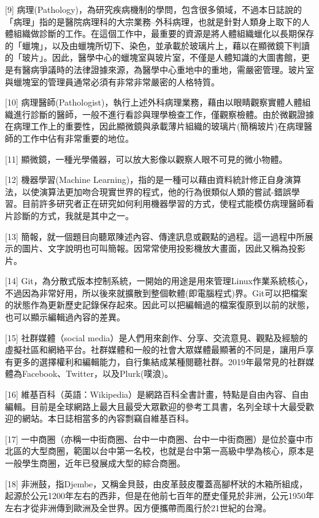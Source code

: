 \documentclass[
]{article}
\begin{document}
{[}9{]}
病理(Pathology)，為研究疾病機制的學問，包含很多領域，不過本日誌說的「病理」指的是醫院病理科的大宗業務--外科病理，也就是針對人類身上取下的人體組織做診斷的工作。在這個工作中，最重要的資源是將人體組織蠟化以長期保存的「蠟塊」，以及由蠟塊所切下、染色，並承載於玻璃片上，藉以在顯微鏡下判讀的「玻片」。因此，醫學中心的蠟塊室與玻片室，不僅是人體知識的大圖書館，更是有醫病爭議時的法律證據來源，為醫學中心重地中的重地，需嚴密管理。玻片室與蠟塊室的管理員通常必須有非常非常嚴密的人格特質。

{[}10{]}
病理醫師(Pathologist)，執行上述外科病理業務，藉由以眼睛觀察實體人體組織進行診斷的醫師，一般不進行看診與理學檢查工作，僅觀察檢體。由於微觀證據在病理工作上的重要性，因此顯微鏡與承載薄片組織的玻璃片(簡稱玻片)在病理醫師的工作中佔有非常重要的地位。

{[}11{]} 顯微鏡，一種光學儀器，可以放大影像以觀察人眼不可見的微小物體。

{[}12{]} 機器學習(Machine
Learning)，指的是一種可以藉由資料統計修正自身演算法，以使演算法更加吻合現實世界的程式，他的行為很類似人類的嘗試-錯誤學習。目前許多研究者正在研究如何利用機器學習的方式，使程式能模仿病理醫師看片診斷的方式，我就是其中之一。

{[}13{]}
簡報，就一個題目向聽眾陳述內容、傳達訊息或觀點的過程。這一過程中所展示的圖片、文字說明也可叫簡報。因常常使用投影機放大畫面，因此又稱為投影片。

{[}14{]}
Git，為分散式版本控制系統，一開始的用途是用來管理Linux作業系統核心，不過因為非常好用，所以後來就擴散到整個軟體(即電腦程式)界。Git可以把檔案的狀態作為更新歷史記錄保存起來。因此可以把編輯過的檔案復原到以前的狀態，也可以顯示編輯過內容的差異。

{[}15{]} 社群媒體（social
media）是人們用來創作、分享、交流意見、觀點及經驗的虛擬社區和網絡平台。社群媒體和一般的社會大眾媒體最顯著的不同是，讓用戶享有更多的選擇權利和編輯能力，自行集結成某種閱聽社群。2019年最常見的社群媒體為Facebook、Twitter，以及Plurk(噗浪)。

{[}16{]}
維基百科（英語：Wikipedia）是網路百科全書計畫，特點是自由內容、自由編輯。目前是全球網路上最大且最受大眾歡迎的參考工具書，名列全球十大最受歡迎的網站。本日誌相當多的內容剽竊自維基百科。

{[}17{]}
一中商圈（亦稱一中街商圈、台中一中商圈、台中一中街商圈）是位於臺中市北區的大型商圈，範圍以台中第一名校，也就是台中第一高級中學為核心，原本是一般學生商圈，近年已發展成大型的綜合商圈。

{[}18{]}
非洲鼓，指Djembe，又稱金貝鼓，由皮革鼓皮覆蓋高腳杯狀的木箱所組成，起源於公元1200年左右的西非，但是在他前七百年的歷史僅見於非洲，公元1950年左右才從非洲傳到歐洲及全世界。因方便攜帶而風行於21世紀的台灣。
\end{document}
